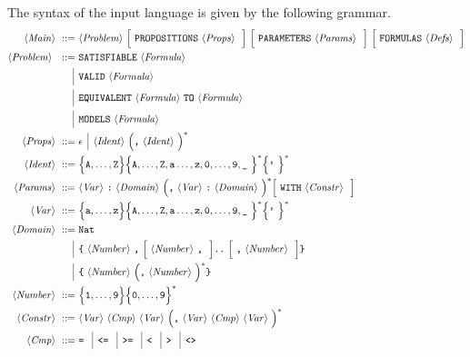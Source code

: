 \documentclass[twoside]{article}
\begin{document}
The syntax of the \DiMo input language is given by the following grammar.
\begin{align*}
\nonterm{Main} ::=\ & \nonterm{Problem} \optional{\term{PROPOSITIONS} \nonterm{Props}}\ 
                                         \optional{\term{PARAMETERS} \nonterm{Params}}\ 
                                         \optional{\term{FORMULAS} \nonterm{Defs}} \\
\nonterm{Problem}\ ::=\ & \term{SATISFIABLE} \nonterm{Formula} \\
                 \altn & \term{VALID} \nonterm{Formula} \\
                 \altn & \term{EQUIVALENT} \nonterm{Formula} \term{TO} \nonterm{Formula} \\
                 \altn & \term{MODELS} \nonterm{Formula} \\
\nonterm{Props} ::=\ & \epsilon \altn \nonterm{Ident} \Big(\term{,} \nonterm{Ident}\Big)^* \\
\nonterm{Ident} ::=\ & \enumset{\texttt{A},\ldots,\texttt{Z}}\enumset{\texttt{A},\ldots,\texttt{Z},\texttt{a}\ldots,\texttt{z},\texttt{0},\ldots,\texttt{9},\term{\_}}^*\enumset{\term{'}}^* \\
\nonterm{Params} ::=\ & \nonterm{Var} \term{:} \nonterm{Domain} \Big( \term{,} \nonterm{Var} \term{:} \nonterm{Domain} \Big)^* 
                           \optional{\term{WITH} \nonterm{Constr}} \\
\nonterm{Var} ::=\ & \enumset{\texttt{a},\ldots,\texttt{z}}\enumset{\texttt{A},\ldots,\texttt{Z},\texttt{a}\ldots,\texttt{z},\texttt{0},\ldots,\texttt{9},\term{\_}}^*\enumset{\term{'}}^* \\ 
\nonterm{Domain} ::=\ & \term{Nat} \\
                \altn & \term{\{} \nonterm{Number} \term{,} \optional{\nonterm{Number} \term{,}} \term{..} 
                                         \optional{\term{,} \nonterm{Number}} \term{\}} \\
                \altn & \term{\{} \nonterm{Number} \group{\term{,} \nonterm{Number}}^* \term{\}} \\
\nonterm{Number} ::=\ & \enumset{\texttt{1},\ldots,\texttt{9}}\enumset{\texttt{0},\ldots,\texttt{9}}^* \\ 
\nonterm{Constr} ::=\ & \nonterm{Var} \nonterm{Cmp} \nonterm{Var} \group{\term{,} \nonterm{Var} \nonterm{Cmp} \nonterm{Var}}^* \\
\nonterm{Cmp} ::=\ & \term{=} \altn \term{<=} \altn \term{>=} \altn \term{<} \altn \term{>} \altn \term{<>} \\ 

\end{align*}
\end{document}
